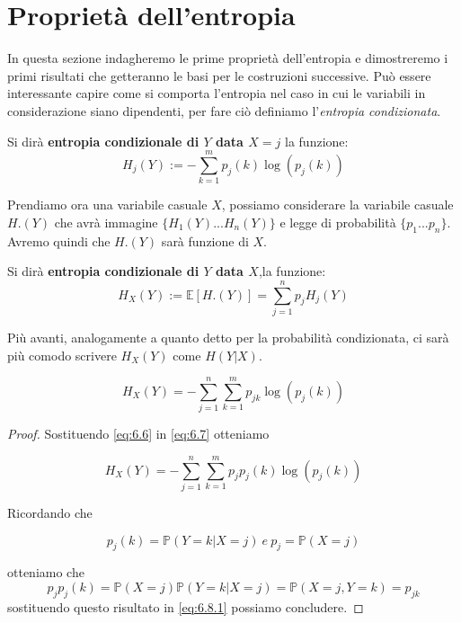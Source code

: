 \vspace{15pt}


\section{Proprietà dell'entropia}
\label{sec:PropriEntropia}
\vspace{10pt}

In questa sezione indagheremo le prime proprietà dell'entropia e dimostreremo i primi risultati che getteranno le basi per le costruzioni successive.
Può essere interessante capire come si comporta l'entropia nel caso in cui le variabili in considerazione siano dipendenti, per fare ciò definiamo l'\textit{entropia condizionata}. 
\begin{defi} \label{defi:condiz}
Si dirà \textbf{entropia condizionale di $Y$ data $X=j$} la funzione: 
\begin{equation}\label{eq:6.6}
H_j(Y):=-\sum_{k=1}^m p_j(k)\log(p_j(k))
\end{equation}
\end{defi}

Prendiamo ora una variabile casuale $X$, possiamo considerare la variabile casuale $H.(Y)$ che avrà immagine $\{H_1(Y)...H_n(Y) \}$ e legge di probabilità $\{ p _1...p_n\}$. Avremo quindi che $H.(Y)$ sarà funzione di $X$.
\begin{defi}
Si dirà \textbf{entropia condizionale di $Y$ data $X$},la funzione:
\begin{equation}\label{eq:6.7}
H_X(Y):= \mathbb{E}[H.(Y)]= \sum_{j=1}^n p_j H_j(Y)
\end{equation}
\end{defi}
\begin{oss}
Più avanti, analogamente a quanto detto per la probabilità condizionata, ci sarà più comodo scrivere $H_X(Y)$ come $H(Y|X)$.
\end{oss}
\begin{lem} \label{lemma:6.8}
\begin{equation} \label{eq:6.8}
H_X(Y)=-\sum_{j=1}^n\sum_{k=1}^m p_{jk}\log(p_j(k))
\end{equation}
\end{lem}
\begin{proof}
Sostituendo \ref{eq:6.6} in \ref{eq:6.7} otteniamo

\begin{equation} \label{eq:6.8.1}
H_X(Y)=-\sum_{j=1}^n\sum_{k=1}^m p_{j}p_j(k)\log(p_j(k))
\end{equation}

Ricordando che 

$$p_j(k)=\mathbb{P}(Y=k|X=j)\ e \ p_j=\mathbb{P}(X=j)$$

otteniamo che 
$$p_jp_j(k)=\mathbb{P}(X=j)\mathbb{P}(Y=k|X=j)=\mathbb{P}(X=j,Y=k)=p_{jk}$$
sostituendo questo risultato in \ref{eq:6.8.1} possiamo concludere.
\end{proof}

